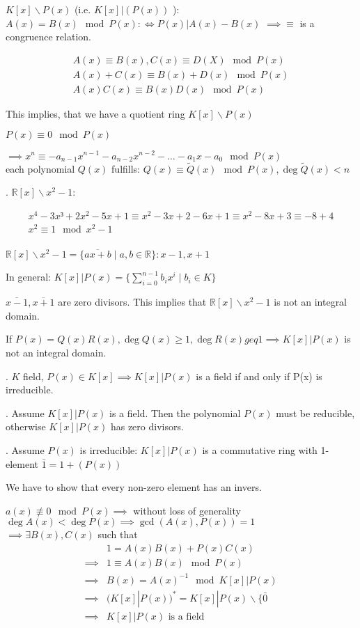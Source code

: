 $K[x]\backslash P(x)$ (i.e. $K[x] | (P(x))$ ): $A(x) = B(x) \mod P(x) :\Leftrightarrow P(x) | A(x) - B(x)$ $\implies \equiv $ is a congruence relation.

\begin{align*}
  A(x) \equiv B(x), C(x) \equiv D(X) \mod P(x) \\
  A(x) + C(x) \equiv B(x) + D(x) \mod P(x) \\
  A(x)C(x) \equiv B(x) D(x) \mod P(x)
\end{align*}

This implies, that we have a quotient ring $K[x]\backslash P(x)$

$P(x) \equiv 0 \mod P(x)$

$\implies x^n \equiv -a_{n-1}x^{n-1} - a_{n-2}x^{n-2} - \ldots - a_1 x - a_0 \mod P(x)$\\
each polynomial $Q(x)$ fulfills:
$Q(x) \equiv \tilde{Q}(x) \mod P(x), \deg \tilde{Q}(x)<n$

\Example.
$\mathbb{R}[x] \backslash x^2-1$:

\begin{align*}
  x^4 - 3x³ + 2x^2 -5x + 1 \equiv x^2 - 3x +2 - 6x + 1 \equiv x^2 - 8x +3 \equiv -8 + 4 \\
  x^2 \equiv 1 \mod x^2 -1 \\
\end{align*}

$\mathbb{R}[x] \backslash x^2 -1 = \{ \overline{ax+b} \mid a,b \in \mathbb{R} \} : x-1, x+1$

In general: $K[x] | P(x) = \{ \sum_{i=0}^{n-1} b_i x^i \mid b_i \in K\}$

$\overline{x-1}, \overline{x+1}$ are zero divisors. This implies that $\mathbb{R}[x] \backslash x^2 -1$ is not an integral domain.

If $P(x) = Q(x)R(x), \deg Q(x) \geq 1, \deg R(x) geq 1 \implies K[x] | P(x)$ is not an integral domain.

\Theorem.
$K$ field, $P(x) \in K[x] \implies K[x] | P(x)$ is a field if and only if P(x) is irreducible.

\ProofForward.
Assume $K[x] | P(x)$ is a field. Then the polynomial $P(x)$ must be reducible, otherwise $K[x] | P(x)$ has zero divisors. 

\ProofBackward. Assume $P(x)$ is irreducible:
$K[x] | P(x)$ is a commutative ring with 1-element $\bar{1} = 1+ (P(x))$

We have to show that every non-zero element has an invers. 

$a(x) \not\equiv 0 \mod P(x) \implies $ without loss of generality $\deg A(x) < \deg P(x) \implies \gcd(A(x), P(x)) = 1$\\
$\implies \exists B(x), C(x)$ such that 
\begin{align*}
  & 1 = A(x)B(x) + P(x)C(x)\\
  \implies & 1 \equiv A(x) B(x) \mod P(x) \\
  \implies & B(x) = A(x)^{-1} \mod K[x] | P(x) \\
  \implies & (K[x] | P(x))^{*} = K[x]|P(x) \backslash \{\bar{0} \\
  \implies & K[x] | P(x) \text{ is a field}
\end{align*}


